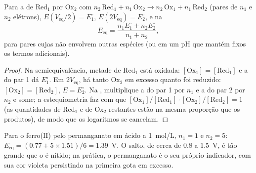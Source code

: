 \begin{proposition}\label{prop:b1:titration-methods:potentiometric-points}
Para a  de $\mathrm{Red_1}$ por $\mathrm{Ox_2}$ com
$n_2\,\mathrm{Red_1} + n_1\,\mathrm{Ox_2} \to n_2\,\mathrm{Ox_1} +
n_1\,\mathrm{Red_2}$ (pares de $n_1$ e $n_2$ elétrons), $E(V_{\mathrm{eq}}/2) = E^\circ_1$, $E(2V_{\mathrm{eq}}) =
E^\circ_2$, e na 
\[
  E_{\mathrm{eq}} = \frac{n_1E^\circ_1 + n_2E^\circ_2}{n_1 + n_2},
\]
para pares cujas  não envolvem outras espécies (ou em um pH
que mantém fixos os termos adicionais).
\end{proposition}

\begin{proof}
Na semiequivalência, metade de $\mathrm{Red_1}$ está oxidada:
$[\mathrm{Ox_1}] = [\mathrm{Red_1}]$ e a  do par 1 dá
$E^\circ_1$. Em $2V_{\mathrm{eq}}$, há tanto $\mathrm{Ox_2}$ em excesso
quanto foi reduzido: $[\mathrm{Ox_2}] = [\mathrm{Red_2}]$, $E = E^\circ_2$.
Na , multiplique a  do par 1 por $n_1$ e a
do par 2 por $n_2$ e some; a estequiometria faz com que
$[\mathrm{Ox_1}]/[\mathrm{Red_1}] \cdot [\mathrm{Ox_2}]/[\mathrm{Red_2}] = 1$
(as quantidades de $\mathrm{Red_1}$ e de $\mathrm{Ox_2}$ restantes estão
na mesma proporção que os produtos), de modo que os logaritmos se
cancelam.
\end{proof}

Para o ferro(II) pelo permanganato em ácido a \qty{1}{mol/L}, $n_1 = 1$ e
$n_2 =
5$: $E_{\mathrm{eq}} = (0.77 + 5 \times 1.51)/6 = 1.39$~V. O salto,
de cerca de 0.8 a 1.5~V, é tão grande que o  é nítido; na
prática, o permanganato é o seu próprio indicador, com sua cor violeta
persistindo na primeira gota em excesso.

